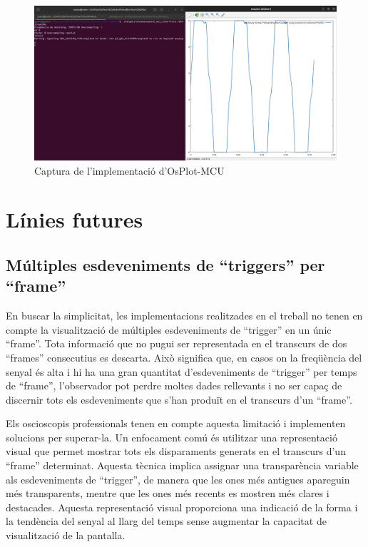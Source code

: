 \documentclass{tfgitic}[2023/06/30]
\begin{document}
\begin{figure}[h]
  \centering
  \includegraphics[width=\textwidth]{imgs/OsPlot-MCU.png}
  \caption{Captura de l'implementació d'OsPlot-MCU}
\end{figure}

\chapter{Línies futures}

\section{Múltiples esdeveniments de ``triggers'' per ``frame''}

En buscar la simplicitat, les implementacions realitzades en el
treball no tenen en compte la visualització de múltiples esdeveniments
de ``trigger'' en un únic ``frame''. Tota informació que no pugui ser
representada en el transcurs de dos ``frames'' consecutius es
descarta. Això significa que, en casos on la freqüència del senyal és
alta i hi ha una gran quantitat d'esdeveniments de ``trigger'' per
temps de ``frame'', l'observador pot perdre moltes dades rellevants i
no ser capaç de discernir tots els esdeveniments que s'han produït en
el transcurs d'un ``frame''.

Els osci\lgem oscopis professionals tenen en compte aquesta limitació
i implementen solucions per superar-la. Un enfocament comú és
utilitzar una representació visual que permet mostrar tots els
disparaments generats en el transcurs d'un ``frame''
determinat. Aquesta tècnica implica assignar una transparència
variable als esdeveniments de ``trigger'', de manera que les ones més
antigues apareguin més transparents, mentre que les ones més recents
es mostren més clares i destacades. Aquesta representació visual
proporciona una indicació de la forma i la tendència del senyal al
llarg del temps sense augmentar la capacitat de visualització de la
pantalla.
\end{document}
